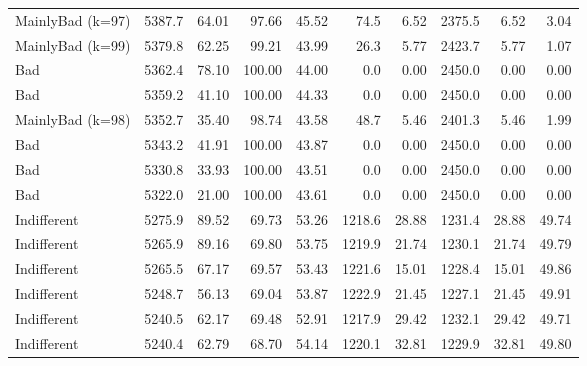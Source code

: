 \documentclass[journal,10pt,twoside]{IEEEtran}
\begin{document}
\begin{table}[ht]
\begin{tabular}{l|rrrr|rrrrr}
        MainlyBad (k=97)  & 5387.7 &  64.01 &  97.66 &   45.52 &   74.5 &                   6.52 & 2375.5 &                    6.52 &     3.04 \\
        MainlyBad (k=99)  & 5379.8 &  62.25 &  99.21 &   43.99 &   26.3 &                   5.77 & 2423.7 &                    5.77 &     1.07 \\
        Bad               & 5362.4 &  78.10 & 100.00 &   44.00 &    0.0 &                   0.00 & 2450.0 &                    0.00 &     0.00 \\
        Bad               & 5359.2 &  41.10 & 100.00 &   44.33 &    0.0 &                   0.00 & 2450.0 &                    0.00 &     0.00 \\
        MainlyBad (k=98)  & 5352.7 &  35.40 &  98.74 &   43.58 &   48.7 &                   5.46 & 2401.3 &                    5.46 &     1.99 \\
        Bad               & 5343.2 &  41.91 & 100.00 &   43.87 &    0.0 &                   0.00 & 2450.0 &                    0.00 &     0.00 \\
        Bad               & 5330.8 &  33.93 & 100.00 &   43.51 &    0.0 &                   0.00 & 2450.0 &                    0.00 &     0.00 \\
        Bad               & 5322.0 &  21.00 & 100.00 &   43.61 &    0.0 &                   0.00 & 2450.0 &                    0.00 &     0.00 \\
        Indifferent       & 5275.9 &  89.52 &  69.73 &   53.26 & 1218.6 &                  28.88 & 1231.4 &                   28.88 &    49.74 \\
        Indifferent       & 5265.9 &  89.16 &  69.80 &   53.75 & 1219.9 &                  21.74 & 1230.1 &                   21.74 &    49.79 \\
        Indifferent       & 5265.5 &  67.17 &  69.57 &   53.43 & 1221.6 &                  15.01 & 1228.4 &                   15.01 &    49.86 \\
        Indifferent       & 5248.7 &  56.13 &  69.04 &   53.87 & 1222.9 &                  21.45 & 1227.1 &                   21.45 &    49.91 \\
        Indifferent       & 5240.5 &  62.17 &  69.48 &   52.91 & 1217.9 &                  29.42 & 1232.1 &                   29.42 &    49.71 \\
        Indifferent       & 5240.4 &  62.79 &  68.70 &   54.14 & 1220.1 &                  32.81 & 1229.9 &                   32.81 &    49.80 \\

\end{tabular}
\end{table}
\end{document}
